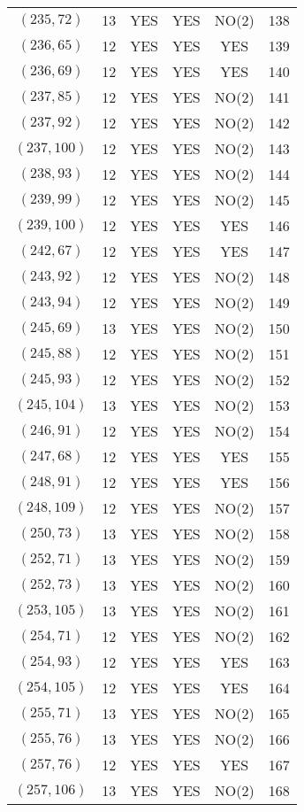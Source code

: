 \begin{longtable}{|c|c|c|c|c|c|}
$(235, 72)$ & 13 & YES & YES & NO(2) & 138\\
$(236, 65)$ & 12 & YES & YES & YES & 139\\
$(236, 69)$ & 12 & YES & YES & YES & 140\\
$(237, 85)$ & 12 & YES & YES & NO(2) & 141\\
$(237, 92)$ & 12 & YES & YES & NO(2) & 142\\
$(237, 100)$ & 12 & YES & YES & NO(2) & 143\\
$(238, 93)$ & 12 & YES & YES & NO(2) & 144\\
$(239, 99)$ & 12 & YES & YES & NO(2) & 145\\
$(239, 100)$ & 12 & YES & YES & YES & 146\\
$(242, 67)$ & 12 & YES & YES & YES & 147\\
$(243, 92)$ & 12 & YES & YES & NO(2) & 148\\
$(243, 94)$ & 12 & YES & YES & NO(2) & 149\\
$(245, 69)$ & 13 & YES & YES & NO(2) & 150\\
$(245, 88)$ & 12 & YES & YES & NO(2) & 151\\
$(245, 93)$ & 12 & YES & YES & NO(2) & 152\\
$(245, 104)$ & 13 & YES & YES & NO(2) & 153\\
$(246, 91)$ & 12 & YES & YES & NO(2) & 154\\
$(247, 68)$ & 12 & YES & YES & YES & 155\\
$(248, 91)$ & 12 & YES & YES & YES & 156\\
$(248, 109)$ & 12 & YES & YES & NO(2) & 157\\
$(250, 73)$ & 13 & YES & YES & NO(2) & 158\\
$(252, 71)$ & 13 & YES & YES & NO(2) & 159\\
$(252, 73)$ & 13 & YES & YES & NO(2) & 160\\
$(253, 105)$ & 13 & YES & YES & NO(2) & 161\\
$(254, 71)$ & 12 & YES & YES & NO(2) & 162\\
$(254, 93)$ & 12 & YES & YES & YES & 163\\
$(254, 105)$ & 12 & YES & YES & YES & 164\\
$(255, 71)$ & 13 & YES & YES & NO(2) & 165\\
$(255, 76)$ & 13 & YES & YES & NO(2) & 166\\
$(257, 76)$ & 12 & YES & YES & YES & 167\\
$(257, 106)$ & 13 & YES & YES & NO(2) & 168\\

\end{longtable}
